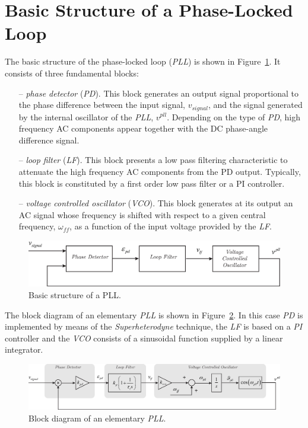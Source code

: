 \documentclass[11pt,a4paper,oneside]{book}
\numberwithin{equation}{section}
\theoremstyle{it}
\theoremstyle{definition}
\begin{document}
\section{Basic Structure of a Phase-Locked Loop}
The basic structure of the phase-locked loop (\textit{PLL}) is shown in Figure~\ref{basic_pll_1}. It consists of three fundamental blocks:
\begin{itemize}
	\item[--] \textit{phase detector} (\textit{PD}). This block generates an output signal proportional to the phase difference between the input signal, $v_{signal}$, and the signal generated by the internal oscillator of the \textit{PLL}, $v^{pll}$. Depending on the type of \textit{PD}, high frequency AC components appear together with the DC phase-angle difference signal.
	\item[--] \textit{loop filter} (\textit{LF}). This block presents a low pass filtering characteristic to attenuate the high frequency AC components from the PD output. Typically, this block is constituted by a first order low pass filter or a PI controller.
	\item[--] \textit{voltage controlled oscillator} (\textit{VCO}). This block generates at its output an AC signal whose frequency is shifted with respect to a given central frequency, $\omega_{ff}$, as a function of the input voltage provided by the \textit{LF}.
\end{itemize}
\begin{figure}[H]
	\centering
	\includegraphics[width = 350pt, angle = 0, 
	keepaspectratio]{figures/basic_pll_1.eps}
	\captionsetup{width=0.5\textwidth, font=small}
	\caption{Basic structure of a PLL.}
	\label{basic_pll_1}
\end{figure}
The block diagram of an elementary \textit{PLL} is shown in Figure~\ref{basic_pll_2}. In this case \textit{PD} is implemented by means of the \textit{Superheterodyne} technique, the \textit{LF} is based on a \textit{PI} controller and the \textit{VCO} consists of a sinusoidal function supplied by a linear integrator.
\begin{figure}[H]
	\centering
	\includegraphics[width = 490pt, angle = 0, 
	keepaspectratio]{figures/basic_pll_2.eps}
	\captionsetup{width=0.5\textwidth, font=small}
	\caption{Block diagram of an elementary \textit{PLL}.}
	\label{basic_pll_2}
\end{figure}
\end{document}
